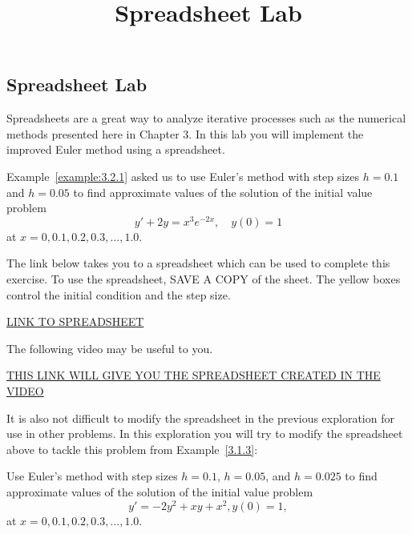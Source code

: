 \documentclass{ximera}
\title{Spreadsheet Lab} \license{CC BY-NC-SA 4.0}
\begin{document}
\begin{abstract}
\end{abstract}
\maketitle

\begin{onlineOnly}
\section*{Spreadsheet Lab}
\end{onlineOnly}
 
Spreadsheets are a great way to analyze iterative processes such as the numerical methods presented here in Chapter 3.  In this lab you will implement the improved Euler method using a spreadsheet.
 
 
\begin{exploration}\label{lab3.2:exp1}
Example~\ref{example:3.2.1} asked us to use Euler's method with step sizes $h=0.1$ and $h=0.05$ to
find approximate values of the solution of the initial value problem
$$
y'+2y=x^3e^{-2x},\quad y(0)=1
$$
at $x=0, 0.1, 0.2, 0.3, \ldots, 1.0$.
 
The link below takes you to a spreadsheet which can be used to complete this exercise.  To use the spreadsheet, SAVE A COPY of the sheet.  The yellow boxes control the initial condition and the step size. 
     
\href{https://docs.google.com/spreadsheets/d/1UZyfR-vJ-ALm6GqvgHudH_0z-KIjuA2OZvAzZBKa4hc/edit?usp=sharing}{LINK TO SPREADSHEET}

The following video may be useful to you.


\href{https://docs.google.com/spreadsheets/d/1UZyfR-vJ-ALm6GqvgHudH_0z-KIjuA2OZvAzZBKa4hc/edit?usp=sharing}{THIS LINK WILL GIVE YOU THE SPREADSHEET CREATED IN THE VIDEO}

\end{exploration}
 
\begin{exploration}\label{lab3.2:exp2}
 It is also not difficult to modify the spreadsheet in the previous exploration for use in other problems.  In this exploration you will try to modify the spreadsheet above to tackle this problem from Example~\ref{3.1.3}:

Use Euler's method with step sizes $h=0.1$, $h=0.05$, and $h=0.025$ to
find approximate values of the solution of the initial value problem
$$
y'=-2y^2+xy+x^2, y(0)=1,
$$
at $x=0, 0.1, 0.2, 0.3, \ldots, 1.0$.


    
\end{exploration}



 

 
\end{document}
